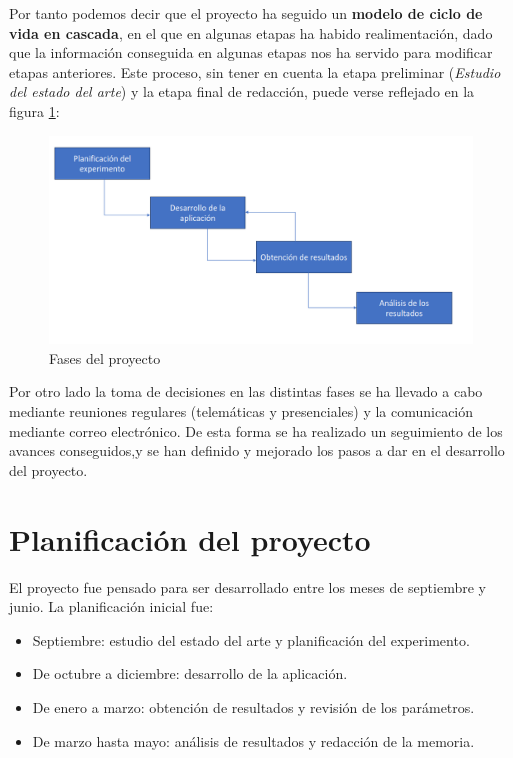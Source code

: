 \documentclass[a4paper,11pt, oneside]{book}
\begin{document}
Por tanto podemos decir que el proyecto ha seguido un \textbf{modelo de ciclo de vida en cascada}, en el que en algunas etapas ha habido realimentación, dado que la información conseguida en algunas etapas nos ha servido para modificar etapas anteriores. Este proceso, sin tener en cuenta la etapa preliminar (\textit{Estudio del estado del arte}) y la etapa final de redacción, puede verse reflejado en la figura \ref{fig:fases}:

\begin{figure}[H]
	
	\centering
	\includegraphics[width=\linewidth]{diagrama-fases}
	\caption{Fases del proyecto}
	\label{fig:fases}
	
\end{figure}

Por otro lado la toma de decisiones en las distintas fases se ha llevado a cabo mediante reuniones regulares (telemáticas y presenciales) y la comunicación mediante correo electrónico. De esta forma se ha realizado un seguimiento de los avances conseguidos,y se han definido y mejorado los pasos a dar en el desarrollo del proyecto. 


\section{Planificación del proyecto}
El proyecto fue pensado para ser desarrollado entre los meses de septiembre y junio. La planificación inicial fue:
\begin{itemize}
	\item Septiembre: estudio del estado del arte y planificación del experimento.
	\item De octubre a diciembre: desarrollo de la aplicación.
	\item De enero a marzo: obtención de resultados y revisión de los parámetros.
	\item De marzo hasta mayo: análisis de resultados y redacción de la memoria.
\end{itemize}
\end{document}
